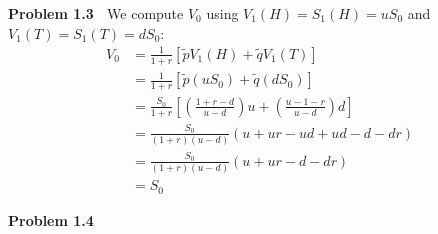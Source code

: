 \documentclass[12pt, letterpaper]{article}
\begin{document}
\vspace{5mm}
\noindent
\textbf{Problem 1.3} $\;$ We compute $V_0$ using $V_1(H) = S_1(H) = uS_0$ and $V_1(T) = S_1(T) = dS_0$:
\begin{align*}
    V_0 &= \frac{1}{1+r} \left[ \tilde p V_1(H) + \tilde q V_1(T) \right] \\
    &= \frac{1}{1+r} \left[ \tilde p (uS_0) + \tilde q (dS_0) \right] \\
    &= \frac{S_0}{1+r} \left[ \left( \frac{1+r - d}{u-d} \right) u + \left( \frac{u-1-r}{u-d} \right) d \right] \\
    &= \frac{S_0}{(1+r)(u-d)} \left( u +ur - ud + ud - d - dr \right) \\
    &= \frac{S_0}{(1+r)(u-d)} \left( u +ur - d - dr \right) \\
    &= S_0
\end{align*}

\vspace{5mm}
\noindent
\textbf{Problem 1.4} $\;$ 
\end{document}
